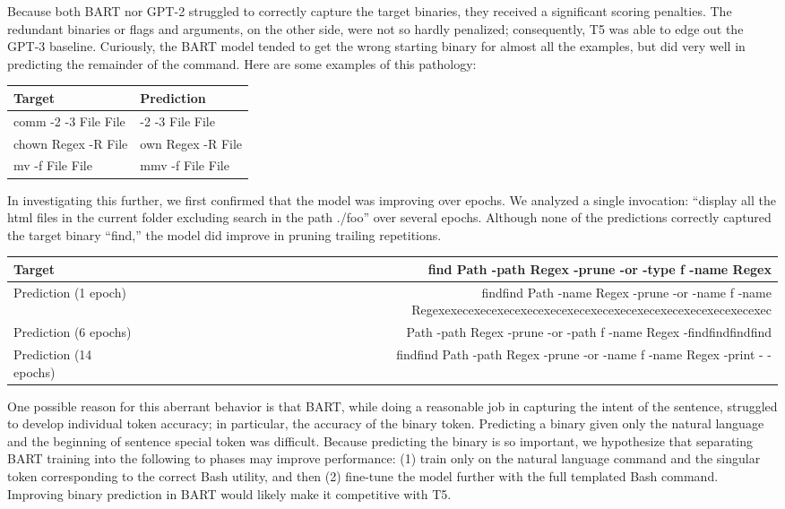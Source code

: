 Because both BART nor GPT-2 struggled to correctly capture the target binaries,
they received a significant scoring penalties. The redundant binaries or flags
and arguments, on the other side, were not so hardly penalized; consequently,
T5 was able to edge out the GPT-3 baseline. Curiously, the BART model tended to
get the wrong starting binary for almost all the examples, but did very well in predicting the remainder of the command. Here are some examples of this pathology:
\begin{center}
	\begin{tabular}{ |O|O| }
		\hline
		\textbf{Target}      & \textbf{Prediction} \\
		\hline
		comm -2 -3 File File &
		-2 -3 File File                            \\
		\hline
		chown Regex -R File  &
		own Regex -R File                          \\
		\hline
		mv -f File File      & mmv -f File File    \\
		\hline
	\end{tabular}
\end{center}
In investigating this further, we first confirmed that the model was improving over epochs.
We analyzed a single invocation: ``display all the html files in the current
folder excluding search in the path ./foo'' over several epochs. Although none
of the predictions correctly captured the target binary ``find,'' the model did
improve in pruning trailing repetitions.
\begin{center}
	\begin{tabular}{|M|N|}
		\hline
		Target                 & find Path -path Regex -prune -or -type f -name Regex                                                             \\
		\hline
		Prediction (1 epoch)   & findfind Path -name Regex -prune -or -name f -name Regexexecexecexecexecexecexecexecexecexecexecexecexecexecexec \\
		\hline
		Prediction (6 epochs)  & Path -path Regex -prune -or -path f -name Regex -findfindfindfind                                                \\
		\hline
		Prediction (14 epochs) & findfind Path -path Regex -prune -or -name f -name Regex -print - -                                              \\
		\hline
	\end{tabular}
\end{center}
One possible reason for this aberrant behavior is that BART, while doing a reasonable job in capturing the intent of the sentence, struggled to develop individual token accuracy; in particular, the accuracy of the binary token. Predicting a binary given only the natural language and the beginning of sentence special token was difficult. Because predicting the binary is so important, we hypothesize that separating BART training into the following to phases may improve performance: (1) train only on the natural language command and the singular token corresponding to the correct Bash utility, and then (2) fine-tune the model further with the full templated Bash command. Improving binary prediction in BART would likely make it competitive with T5.
